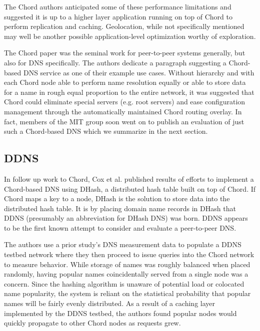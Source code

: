 \documentclass[sigconf]{acmart}
\begin{document}
The Chord authors anticipated some of these performance limitations and
suggested it is up to a higher layer application running on top of Chord
to perform replication and caching.  Geolocation, while not specifically
mentioned may well be another possible application-level optimization
worthy of exploration.

The Chord paper was the seminal work for peer-to-peer systems generally,
but also for DNS specifically.  The authors dedicate a paragraph
suggesting a Chord-based DNS service as one of their example use cases.
Without hierarchy and with each Chord node able to perform name
resolution equally or able to store data for a name in rough equal
proportion to the entire network, it was suggested that Chord could
eliminate special servers (e.g. root servers) and ease configuration
management through the automatically maintained Chord routing overlay.
In fact, members of the MIT group soon went on to publish an evaluation
of just such a Chord-based DNS which we summarize in the next section.

\subsection{DDNS}

In follow up work to Chord, Cox et al. published results of efforts to
implement a Chord-based DNS using DHash, a distributed hash table built
on top of Chord.\cite{dabek_building_2001}  If Chord maps a key to a
node, DHash is the solution to store data into the distributed hash
table.  It is by placing domain name records in DHash that DDNS
(presumably an abbreviation for DHash DNS) was born.  DDNS appears to be
the first known attempt to consider and evaluate a peer-to-peer DNS.

The authors use a prior study's DNS measurement data to populate a DDNS
testbed network where they then proceed to issue queries into the Chord
network to measure behavior.\cite{jung_dns_2002}  While storage of names
was roughly balanced when placed randomly, having popular names
coincidentally served from a single node was a concern.  Since the
hashing algorithm is unaware of potential load or colocated name
popularity, the system is reliant on the statistical probability that
popular names will be fairly evenly distributed.  As a result of a
caching layer implemented by the DDNS testbed, the authors found popular
nodes would quickly propagate to other Chord nodes as requests grew.
\end{document}
